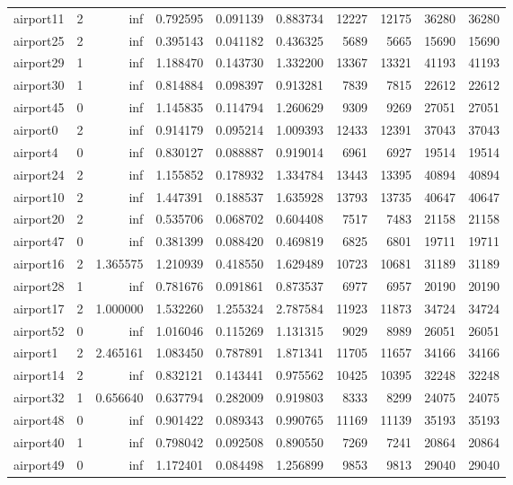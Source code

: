 \begin{longtable}{|l|r|r|r|r|r|r|r|r|r|}
airport11 & 2 & inf & 0.792595 & 0.091139 & 0.883734 & 12227 & 12175 & 36280 & 36280 \\
airport25 & 2 & inf & 0.395143 & 0.041182 & 0.436325 & 5689 & 5665 & 15690 & 15690 \\
airport29 & 1 & inf & 1.188470 & 0.143730 & 1.332200 & 13367 & 13321 & 41193 & 41193 \\
airport30 & 1 & inf & 0.814884 & 0.098397 & 0.913281 & 7839 & 7815 & 22612 & 22612 \\
airport45 & 0 & inf & 1.145835 & 0.114794 & 1.260629 & 9309 & 9269 & 27051 & 27051 \\
airport0 & 2 & inf & 0.914179 & 0.095214 & 1.009393 & 12433 & 12391 & 37043 & 37043 \\
airport4 & 0 & inf & 0.830127 & 0.088887 & 0.919014 & 6961 & 6927 & 19514 & 19514 \\
airport24 & 2 & inf & 1.155852 & 0.178932 & 1.334784 & 13443 & 13395 & 40894 & 40894 \\
airport10 & 2 & inf & 1.447391 & 0.188537 & 1.635928 & 13793 & 13735 & 40647 & 40647 \\
airport20 & 2 & inf & 0.535706 & 0.068702 & 0.604408 & 7517 & 7483 & 21158 & 21158 \\
airport47 & 0 & inf & 0.381399 & 0.088420 & 0.469819 & 6825 & 6801 & 19711 & 19711 \\
airport16 & 2 & 1.365575 & 1.210939 & 0.418550 & 1.629489 & 10723 & 10681 & 31189 & 31189 \\
airport28 & 1 & inf & 0.781676 & 0.091861 & 0.873537 & 6977 & 6957 & 20190 & 20190 \\
airport17 & 2 & 1.000000 & 1.532260 & 1.255324 & 2.787584 & 11923 & 11873 & 34724 & 34724 \\
airport52 & 0 & inf & 1.016046 & 0.115269 & 1.131315 & 9029 & 8989 & 26051 & 26051 \\
airport1 & 2 & 2.465161 & 1.083450 & 0.787891 & 1.871341 & 11705 & 11657 & 34166 & 34166 \\
airport14 & 2 & inf & 0.832121 & 0.143441 & 0.975562 & 10425 & 10395 & 32248 & 32248 \\
airport32 & 1 & 0.656640 & 0.637794 & 0.282009 & 0.919803 & 8333 & 8299 & 24075 & 24075 \\
airport48 & 0 & inf & 0.901422 & 0.089343 & 0.990765 & 11169 & 11139 & 35193 & 35193 \\
airport40 & 1 & inf & 0.798042 & 0.092508 & 0.890550 & 7269 & 7241 & 20864 & 20864 \\
airport49 & 0 & inf & 1.172401 & 0.084498 & 1.256899 & 9853 & 9813 & 29040 & 29040 \\

\end{longtable}

